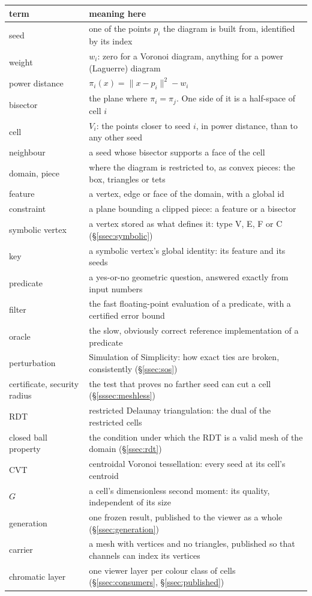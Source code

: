 \documentclass[11pt,a4paper]{article}
\newcommand{\norm}[1]{\lVert #1\rVert}
\newcommand{\secref}[1]{\S\ref{#1}}
\begin{document}
{\small
\begin{xltabular}{\linewidth}{@{}P{4cm} L@{}}
\toprule
term & meaning here \\
\midrule
\endhead
seed & one of the points $p_i$ the diagram is built from, identified by its index \\
weight & $w_i$: zero for a Voronoi diagram, anything for a power (Laguerre) diagram \\
power distance & $\pi_i(x) = \norm{x - p_i}^2 - w_i$ \\
bisector & the plane where $\pi_i = \pi_j$. One side of it is a half-space of cell $i$ \\
cell & $V_i$: the points closer to seed $i$, in power distance, than to any other seed \\
neighbour & a seed whose bisector supports a face of the cell \\
domain, piece & where the diagram is restricted to, as convex pieces: the box, triangles or
  tets \\
feature & a vertex, edge or face of the domain, with a global id \\
constraint & a plane bounding a clipped piece: a feature or a bisector \\
symbolic vertex & a vertex stored as what defines it: type V, E, F or C
  (\secref{ssec:symbolic}) \\
key & a symbolic vertex's global identity: its feature and its seeds \\
predicate & a yes-or-no geometric question, answered exactly from input numbers \\
filter & the fast floating-point evaluation of a predicate, with a certified error bound \\
oracle & the slow, obviously correct reference implementation of a predicate \\
perturbation & Simulation of Simplicity: how exact ties are broken, consistently
  (\secref{ssec:sos}) \\
certificate, security radius & the test that proves no farther seed can cut a cell
  (\secref{sssec:meshless}) \\
RDT & restricted Delaunay triangulation: the dual of the restricted cells \\
closed ball property & the condition under which the RDT is a valid mesh of the domain
  (\secref{ssec:rdt}) \\
CVT & centroidal Voronoi tessellation: every seed at its cell's centroid \\
$G$ & a cell's dimensionless second moment: its quality, independent of its size \\
generation & one frozen result, published to the viewer as a whole
  (\secref{ssec:generation}) \\
carrier & a mesh with vertices and no triangles, published so that channels can index its
  vertices \\
chromatic layer & one viewer layer per colour class of cells (\secref{ssec:consumers},
  \secref{ssec:published}) \\
\bottomrule
\end{xltabular}}
\end{document}
